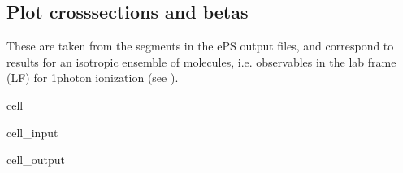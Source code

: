 \documentclass[letterpaper,10pt,english]{jupyterBook}
\begin{document}
\subsection{Plot cross\sphinxhyphen{}sections and betas}
\label{\detokenize{testChpt/ePSproc_class_demo_161020:plot-cross-sections-and-betas}}
\sphinxAtStartPar
These are taken from the  segments in the ePS output files, and correspond to results for an isotropic ensemble of molecules, i.e. observables in the lab frame (LF) for 1\sphinxhyphen{}photon ionization (see ).

\begin{sphinxuseclass}{cell}\begin{sphinxVerbatimInput}

\begin{sphinxuseclass}{cell_input}
\begin{sphinxVerbatim}[commandchars=\\\{\}]
\end{sphinxVerbatim}

\end{sphinxuseclass}\end{sphinxVerbatimInput}
\begin{sphinxVerbatimOutput}

\begin{sphinxuseclass}{cell_output}
\noindent{}

\noindent{}

\end{sphinxuseclass}\end{sphinxVerbatimOutput}

\end{sphinxuseclass}
\end{document}
